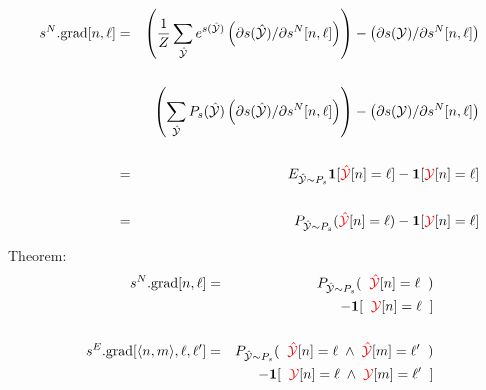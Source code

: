 {\huge{
\begin{eqnarray*}
    s^N.\mathrm{grad}[n,\ell] & = & \left(\frac{1}{Z} \sum_{\hat{\cal Y}} e^{s(\hat{\cal Y})} \left(\partial s(\hat{\cal Y})/\partial s^N[n,\ell]\right)\right)
    - \left(\partial s({\cal Y}) /\partial s^N[n,\ell]\right)  \\
    \\
    & & \left(\sum_{\hat{\cal Y}} P_s(\hat{\cal Y}) \left(\partial s(\hat{\cal Y})/\partial s^N[n,\ell]\right)\right)
    - \left(\partial s({\cal Y}) /\partial s^N[n,\ell]\right)    \\
    \\
    & = & E_{\hat{\cal Y} \sim P_s}\mathbf{1}[{\color{red} \hat{\cal Y}}[n] = \ell]
    - \mathbf{1}[{\color{red}{\cal Y}}[n] = \ell] \\
    \\
    & = & P_{\hat{\cal Y} \sim P_s}({\color{red} \hat{\cal Y}}[n] = \ell)
      - \mathbf{1}[{\color{red}{\cal Y}}[n] = \ell]
\end{eqnarray*}
}


Theorem:
\begin{eqnarray*}
    s^N.\mathrm{grad}[n,\ell] & = &   P_{\hat{\cal Y} \sim P_s}(\;\;{\color{red} \hat{\cal Y}}[n] = \ell\;\;) \\
    & & \;\;\;\;\;- \mathbf{1}[\;\;{\color{red} {\cal Y}}[n] = \ell\;\;] \\
    \\
    s^E.\mathrm{grad}[{\mbox{$\langle n,m\rangle$}},\ell,\ell'] & = &  P_{\hat{\cal Y} \sim P_s}(\;\;{\color{red} \hat{\cal Y}}[n] = \ell \; \wedge \; {\color{red} \hat{\cal Y}}[m] = \ell'\;\;) \\
    & & \;\;\;\;\;- \mathbf{1}[\;\;{\color{red} {\cal Y}}[n] = \ell\; \wedge \; {\color{red} {\cal Y}}[m] = \ell'\;\;]
\end{eqnarray*}


}


